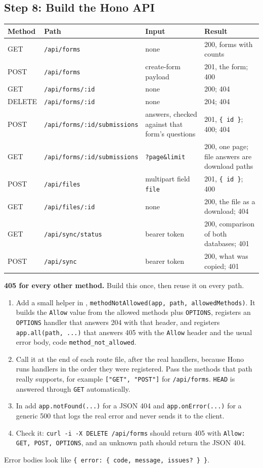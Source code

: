 \documentclass[11pt,a4paper]{article}
\begin{document}
\subsection*{Step 8: Build the Hono API}
\begin{center}
\begin{tabular}{@{}p{1.7cm}p{5.5cm}p{3.3cm}p{4.1cm}@{}}
\toprule
\textbf{Method} & \textbf{Path} & \textbf{Input} & \textbf{Result}\\
\midrule
GET & \texttt{/api/forms} & none & 200, forms with counts\\
POST & \texttt{/api/forms} & create-form payload & 201, the form; 400\\
GET & \texttt{/api/forms/:id} & none & 200; 404\\
DELETE & \texttt{/api/forms/:id} & none & 204; 404\\
POST & \texttt{/api/forms/:id/submissions} & answers, checked against that form's questions & 201, \texttt{\{ id \}}; 400; 404\\
GET & \texttt{/api/forms/:id/submissions} & \texttt{?page\&limit} & 200, one page; file answers are download paths\\
POST & \texttt{/api/files} & multipart field \texttt{file} & 201, \texttt{\{ id \}}; 400\\
GET & \texttt{/api/files/:id} & none & 200, the file as a download; 404\\
GET & \texttt{/api/sync/status} & bearer token & 200, comparison of both databases; 401\\
POST & \texttt{/api/sync} & bearer token & 200, what was copied; 401\\
\bottomrule
\end{tabular}
\end{center}

\textbf{405 for every other method.} Build this once, then reuse it on every path.
\begin{enumerate}
  \item Add a small helper in , \texttt{methodNotAllowed(app, path, allowedMethods)}. It builds the \texttt{Allow} value from the allowed methods plus \texttt{OPTIONS}, registers an \texttt{OPTIONS} handler that answers 204 with that header, and registers \texttt{app.all(path, ...)} that answers 405 with the \texttt{Allow} header and the usual error body, code \texttt{method\_not\_allowed}.
  \item Call it at the end of each route file, after the real handlers, because Hono runs handlers in the order they were registered. Pass the methods that path really supports, for example \texttt{["GET", "POST"]} for \texttt{/api/forms}. \texttt{HEAD} is answered through \texttt{GET} automatically.
  \item In  add \texttt{app.notFound(...)} for a JSON 404 and \texttt{app.onError(...)} for a generic 500 that logs the real error and never sends it to the client.
  \item Check it: \texttt{curl -i -X DELETE /api/forms} should return 405 with \texttt{Allow: GET, POST, OPTIONS}, and an unknown path should return the JSON 404.
\end{enumerate}
Error bodies look like \texttt{\{ error: \{ code, message, issues? \} \}}.
\end{document}

